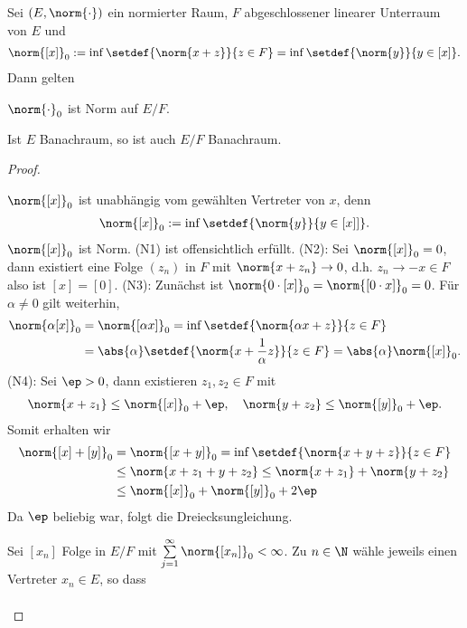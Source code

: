 \begin{prop}
\label{prop:1.15}
Sei $(E,\norm{\cdot})$ ein normierter Raum, $F$ abgeschlossener linearer
Unterraum von $E$ und
\begin{align*}
\norm{[x]}_0 := \inf\setdef{\norm{x+z}}{z\in F} = \inf\setdef{\norm{y}}{y\in
[x]}.
\end{align*}
Dann gelten
\begin{propenum}
  \item $\norm{\cdot}_0$ ist Norm auf $E/F$.
  \item Ist $E$ Banachraum, so ist auch $E/F$ Banachraum.\fishhere
\end{propenum}
\end{prop}
\begin{proof}
\begin{proofenum}
  \item $\norm{[x]}_0$ ist unabhängig vom gewählten Vertreter von $x$,
  denn
\begin{align*}
\norm{[x]}_0 :=  \inf\setdef{\norm{y}}{y\in
[x]]}.
\end{align*}
$\norm{[x]}_0$ ist Norm. (N1) ist offensichtlich erfüllt. (N2): Sei
$\norm{[x]}_0 = 0$, dann existiert eine Folge $(z_n)$ in $F$ mit
$\norm{x+z_n}\to 0$, d.h. $z_n\to-x\in F$ also ist $[x]=[0]$.
(N3): Zunächst ist $\norm{0\cdot[x]}_0 = \norm{[0\cdot x]}_0 = 0$. Für
$\alpha\neq0$ gilt weiterhin,
\begin{align*}
\norm{\alpha[x]}_0 &= \norm{[\alpha x]}_0 = \inf\setdef{\norm{\alpha x +
z}}{z\in F} \\ &= \abs{\alpha}\setdef{\norm{x+\frac{1}{\alpha}z}}{z\in F} =
\abs{\alpha}\norm{[x]}_0.
\end{align*}
(N4): Sei $\ep>0$, dann existieren $z_1,z_2\in F$ mit
\begin{align*}
 \norm{x+z_1} \le \norm{[x]}_0+\ep,\quad
\norm{y+z_2} \le \norm{[y]}_0 + \ep.
\end{align*}
Somit erhalten wir
\begin{align*}
\norm{[x]+[y]}_0 &= \norm{[x+y]}_0
= \inf\setdef{\norm{x+y+z}}{z\in F}\\
&\le \norm{x+z_1+y+z_2}
\le \norm{x+z_1} + \norm{y+z_2}
\\ &\le \norm{[x]}_0 + \norm{[y]}_0 + 2\ep
\end{align*}
Da $\ep$ beliebig war, folgt die Dreiecksungleichung.
\item Sei $[x_n]$ Folge in $E/F$ mit $\sum\limits_{j=1}^\infty \norm{[x_n]}_0
<\infty$. Zu $n\in\N$ wähle jeweils einen Vertreter $x_n\in E$, so dass
\begin{align*}

\end{align*}
\end{proofenum}
\end{proof}
